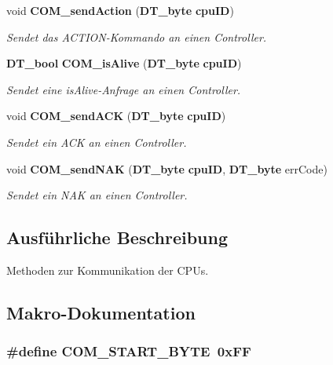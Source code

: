 \begin{DoxyCompactItemize}
void {\bf COM\_\-sendAction} ({\bf DT\_\-byte} {\bf cpuID})
\begin{DoxyCompactList}\small\item\em Sendet das ACTION-\/Kommando an einen Controller. \item\end{DoxyCompactList}\item 
{\bf DT\_\-bool} {\bf COM\_\-isAlive} ({\bf DT\_\-byte} {\bf cpuID})
\begin{DoxyCompactList}\small\item\em Sendet eine isAlive-\/Anfrage an einen Controller. \item\end{DoxyCompactList}\item 
void {\bf COM\_\-sendACK} ({\bf DT\_\-byte} {\bf cpuID})
\begin{DoxyCompactList}\small\item\em Sendet ein ACK an einen Controller. \item\end{DoxyCompactList}\item 
void {\bf COM\_\-sendNAK} ({\bf DT\_\-byte} {\bf cpuID}, {\bf DT\_\-byte} errCode)
\begin{DoxyCompactList}\small\item\em Sendet ein NAK an einen Controller. \item\end{DoxyCompactList}\end{DoxyCompactItemize}


\subsection{Ausführliche Beschreibung}
Methoden zur Kommunikation der CPUs. 

\subsection{Makro-\/Dokumentation}
\subsubsection[{COM\_\-START\_\-BYTE}]{\setlength{\rightskip}{0pt plus 5cm}\#define COM\_\-START\_\-BYTE~0xFF}\label{communication_8c_a114619e381023d4d074f89b994334969}


